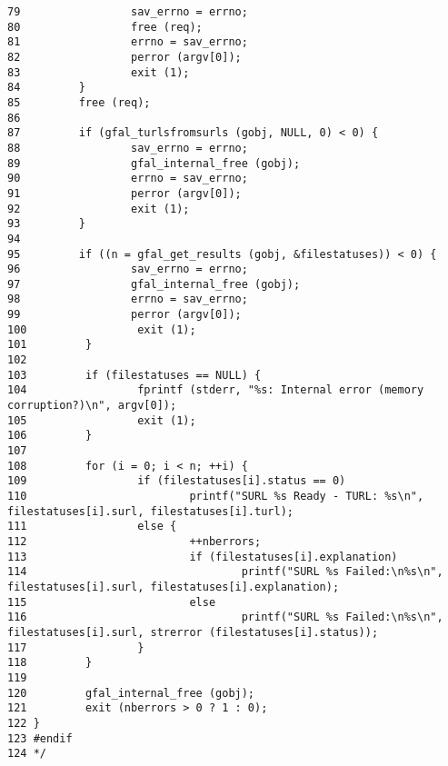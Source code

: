 \begin{DocInclude}
\begin{verbatim}
79                 sav_errno = errno;
80                 free (req);
81                 errno = sav_errno;
82                 perror (argv[0]);
83                 exit (1);
84         }
85         free (req);
86 
87         if (gfal_turlsfromsurls (gobj, NULL, 0) < 0) {
88                 sav_errno = errno;
89                 gfal_internal_free (gobj);
90                 errno = sav_errno;
91                 perror (argv[0]);
92                 exit (1);
93         }
94 
95         if ((n = gfal_get_results (gobj, &filestatuses)) < 0) {
96                 sav_errno = errno;
97                 gfal_internal_free (gobj);
98                 errno = sav_errno;
99                 perror (argv[0]);
100                 exit (1);
101         }
102 
103         if (filestatuses == NULL) {
104                 fprintf (stderr, "%s: Internal error (memory corruption?)\n", argv[0]);
105                 exit (1);
106         }
107 
108         for (i = 0; i < n; ++i) {
109                 if (filestatuses[i].status == 0)
110                         printf("SURL %s Ready - TURL: %s\n", filestatuses[i].surl, filestatuses[i].turl);
111                 else {
112                         ++nberrors;
113                         if (filestatuses[i].explanation)
114                                 printf("SURL %s Failed:\n%s\n", filestatuses[i].surl, filestatuses[i].explanation);
115                         else
116                                 printf("SURL %s Failed:\n%s\n", filestatuses[i].surl, strerror (filestatuses[i].status));
117                 }
118         }
119 
120         gfal_internal_free (gobj);
121         exit (nberrors > 0 ? 1 : 0);
122 }
123 #endif
124 */
\end{verbatim}
\end{DocInclude}
 